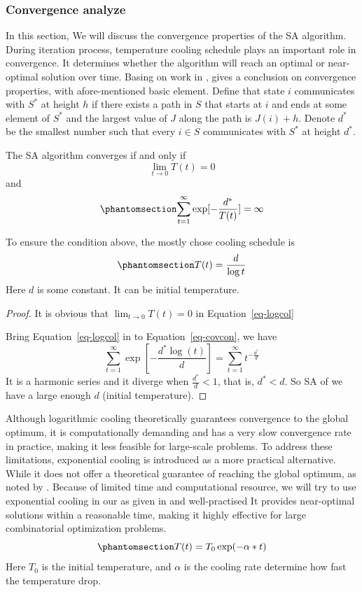 \documentclass[
  a4paper,
  oneside,
  openany,
  12pt,
  onecolumn]{book}
\theoremstyle{definition}
\theoremstyle{definition}
\theoremstyle{plain}
\theoremstyle{remark}
\begin{document}
\subsubsection{Convergence analyze}\label{convergence-analyze}

In this section, We will discuss the convergence properties of the SA
algorithm. During iteration process, temperature cooling schedule plays
an important role in convergence. It determines whether the algorithm
will reach an optimal or near-optimal solution over time. Basing on work
in \citet{sasaki1988time}, \citet{bertsimas1993simulated} gives a
conclusion on convergence properties, with afore-mentioned basic
element. Define that state \(i\) communicates with \(S^*\) at height
\(h\) if there exists a path in \(S\) that starts at \(i\) and ends at
some element of \(S^*\) and the largest value of \(J\) along the path is
\(J(i)+h\). Denote \(d^*\) be the smallest number such that every
\(i \in S\) communicates with \(S^*\) at height \(d^*\).

The SA algorithm converges if and only if \[
\lim_{t\to 0} T(t)=0
\] and \begin{equation}\phantomsection\label{eq-covcon}{
\sum_{t=1}^{\infty} \exp[-\frac{d^*}{T(t)}]=\infty
}\end{equation}

To ensure the condition above, the mostly chose cooling schedule is
\begin{equation}\phantomsection\label{eq-logcol}{
T(t) = \frac{d}{\log t}
}\end{equation} Here \(d\) is some constant. It can be initial
temperature.

\begin{proof}
It is obvious that \(\lim_{t\to 0} T(t)=0\) in Equation~\ref{eq-logcol}

Bring Equation~\ref{eq-logcol} in to Equation~\ref{eq-covcon}, we have
\[
\sum_{t=1}^{\infty} \exp[-\frac{d^*\log (t)}{d}]=\sum_{t=1}^{\infty}t^{-\frac{d^*}{d}}
\] It is a harmonic series and it diverge when \(\frac{d^*}{d}<1\), that
is, \(d^*<d\). So SA of we have a large enough \(d\) (initial
temperature).
\end{proof}

Although logarithmic cooling theoretically guarantees convergence to the
global optimum, it is computationally demanding and has a very slow
convergence rate in practice, making it less feasible for large-scale
problems. To address these limitations, exponential cooling is
introduced as a more practical alternative. While it does not offer a
theoretical guarantee of reaching the global optimum, as noted by
\citet{kirkpatrick1983optimization}. Because of limited time and
computational resource, we will try to use exponential cooling in our as
given in \citet{aarts1989simulated} and well-practised It provides
near-optimal solutions within a reasonable time, making it highly
effective for large combinatorial optimization problems.
\begin{equation}\phantomsection\label{eq-expcol}{
T(t) = T_0 \exp(-\alpha*t)
}\end{equation} Here \(T_0\) is the initial temperature, and \(\alpha\)
is the cooling rate determine how fast the temperature drop.
\end{document}
